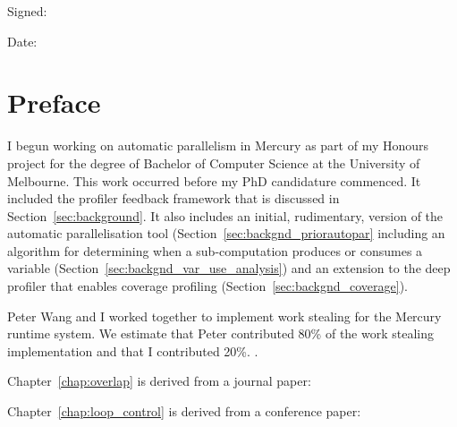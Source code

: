 \documentclass[a4paper,twoside]{report}
\begin{document}
\vspace{1em}

\noindent Signed:

\vspace{1em}

\noindent Date:

\chapter*{Preface}

I begun working on automatic parallelism in Mercury as part of my Honours project
for the degree of Bachelor of Computer Science at the University of Melbourne.
This work occurred before my PhD candidature commenced.
It included the profiler feedback framework that is discussed in
Section~\ref{sec:background}.
It also includes an initial, rudimentary, version of the automatic
parallelisation tool
(Section~\ref{sec:backgnd_priorautopar}
including an algorithm for determining when a sub-computation produces or
consumes a variable (Section~\ref{sec:backgnd_var_use_analysis})
and an extension to the deep profiler that enables coverage profiling
(Section~\ref{sec:backgnd_coverage}).

Peter Wang and I worked together to implement work stealing for the Mercury
runtime system.
We estimate that Peter contributed 80\% of the work stealing implementation
and that I contributed 20\%.
.

Chapter~\ref{chap:overlap} is derived from a journal paper:


\begin{quote}
\end{quote}


Chapter~\ref{chap:loop_control} is derived from a conference paper:
\end{document}
